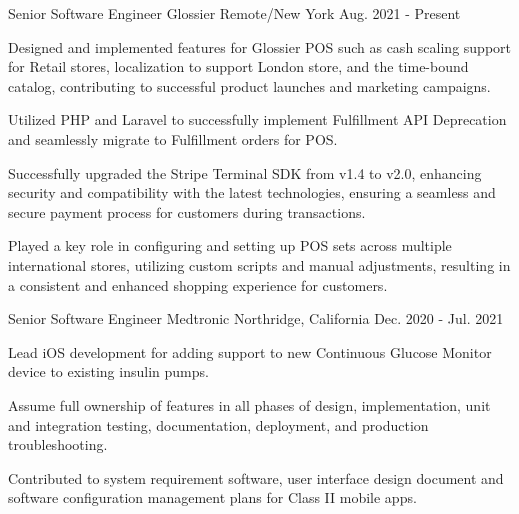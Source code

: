 

\begin{cventries}

  \cventry
    {Senior Software Engineer} %
    {Glossier} %
    {Remote/New York} %
    {Aug. 2021 - Present} %
    {
      \begin{cvitems} %
        \item {Designed and implemented features for Glossier POS such as cash scaling support for Retail stores, localization to support London store, and the time-bound catalog, contributing to successful product launches and marketing campaigns.}
        \item {Utilized PHP and Laravel to successfully implement Fulfillment API Deprecation and seamlessly migrate to Fulfillment orders for POS.}
        \item {Successfully upgraded the Stripe Terminal SDK from v1.4 to v2.0, enhancing security and compatibility with the latest technologies, ensuring a seamless and secure payment process for customers during transactions.}
        \item {Played a key role in configuring and setting up POS sets across multiple international stores, utilizing custom scripts and manual adjustments, resulting in a consistent and enhanced shopping experience for customers.}
      \end{cvitems}
    }


  \cventry
    {Senior Software Engineer} %
    {Medtronic} %
    {Northridge, California} %
    {Dec. 2020 - Jul. 2021} %
    {
      \begin{cvitems} %
        \item {Lead iOS development for adding support to new Continuous Glucose Monitor device to existing insulin pumps.}
        \item {Assume full ownership of features in all phases of design, implementation, unit and integration testing, documentation, deployment, and production troubleshooting.}
        \item {Contributed to system requirement software, user interface design document and software configuration management plans for Class II mobile apps.}
      \end{cvitems}
    }


\end{cventries}
